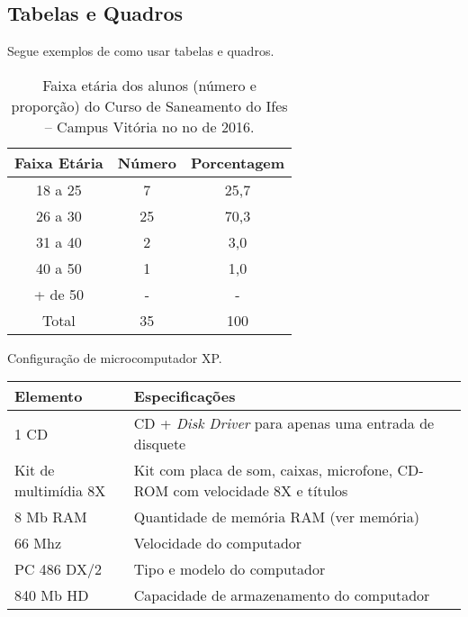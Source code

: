 \subsection{Tabelas e Quadros}

Segue exemplos de como usar tabelas e quadros.

\begin{table}[ht]
  \caption{Faixa etária dos alunos (número e proporção) do Curso de Saneamento do Ifes – Campus Vitória no no de 2016.}
  \label{tab: table1}
  \centering

  \begin{tabular}{ccc}
    \hline
    \bfseries Faixa Etária & \bfseries Número & \bfseries Porcentagem\\
    \hline
    18 a 25 & 7 & 25,7 \\
    26 a 30 & 25 & 70,3 \\
    31 a 40 & 2 & 3,0 \\
    40 a 50 & 1 & 1,0 \\
    + de 50 & - & - \\
    \hline
    Total & 35 & 100 \\
    \hline
  \end{tabular}

\end{table}
  
\begin{quadro}[ht]
  \caption{Configuração de microcomputador XP.}
  \label{quad: quadro1}
  \centering
  
  \begin{tabularx}{\textwidth}{lX}
    \hline
    \bfseries Elemento & \bfseries Especificações\\
    \hline
    1 CD & CD + \textit{Disk Driver} para apenas uma entrada de disquete \\
    Kit de multimídia 8X & Kit com placa de som, caixas, microfone, CD-ROM com velocidade 8X e títulos \\
    8 Mb RAM & Quantidade de memória RAM (ver memória) \\
    66 Mhz & Velocidade do computador \\
    PC 486 DX/2 & Tipo e modelo do computador \\
    840 Mb HD & Capacidade de armazenamento do computador \\
    \hline
  \end{tabularx}

\end{quadro}

